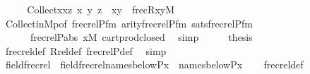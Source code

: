 \begin{isabellebody}
\isamarkupfalse%
\ {\isacharminus}{\kern0pt}\isanewline
\ \ \isamarkupfalse%
\ {\isachardoublequoteopen}Collect{\isacharparenleft}{\kern0pt}x{\isasymtimes}x{\isacharcomma}{\kern0pt}{\isasymlambda}z{\isachardot}{\kern0pt}\ {\isacharparenleft}{\kern0pt}{\isasymexists}x\ y{\isachardot}{\kern0pt}\ z\ {\isacharequal}{\kern0pt}\ {\isasymlangle}x{\isacharcomma}{\kern0pt}y{\isasymrangle}\ {\isasymand}\ frecR{\isacharparenleft}{\kern0pt}x{\isacharcomma}{\kern0pt}y{\isacharparenright}{\kern0pt}{\isacharparenright}{\kern0pt}{\isacharparenright}{\kern0pt}{\isasymin}M{\isachardoublequoteclose}\isanewline
\ \ \ \ \isamarkupfalse%
\ Collect{\isacharunderscore}{\kern0pt}in{\isacharunderscore}{\kern0pt}M{\isacharunderscore}{\kern0pt}{}p{\isacharbrackleft}{\kern0pt}of\ {\isachardoublequoteopen}frecrelP{\isacharunderscore}{\kern0pt}fm{\isacharparenleft}{\kern0pt}{}{\isacharparenright}{\kern0pt}{\isachardoublequoteclose}{\isacharbrackright}{\kern0pt}\ arity{\isacharunderscore}{\kern0pt}frecrelP{\isacharunderscore}{\kern0pt}fm\ sats{\isacharunderscore}{\kern0pt}frecrelP{\isacharunderscore}{\kern0pt}fm\isanewline
\ \ \ \ \ \ frecrelP{\isacharunderscore}{\kern0pt}abs\ {\isacartoucheopen}x{\isasymin}M{\isacartoucheclose}\ cartprod{\isacharunderscore}{\kern0pt}closed\ \isamarkupfalse%
\ simp\isanewline
\ \ \isamarkupfalse%
\ \isamarkupfalse%
\ {\isacharquery}{\kern0pt}thesis\isanewline
\ \ \ \ \isamarkupfalse%
\ frecrel{\isacharunderscore}{\kern0pt}def\ Rrel{\isacharunderscore}{\kern0pt}def\ frecrelP{\isacharunderscore}{\kern0pt}def\ \isamarkupfalse%
\ simp\isanewline
{}\isamarkupfalse%
%
\endisatagproof
{\isafoldproof}%
%
\isadelimproof
\isanewline
%
\endisadelimproof
\isanewline
{}\isamarkupfalse%
\ field{\isacharunderscore}{\kern0pt}frecrel\ {\isacharcolon}{\kern0pt}\ {\isachardoublequoteopen}field{\isacharparenleft}{\kern0pt}frecrel{\isacharparenleft}{\kern0pt}names{\isacharunderscore}{\kern0pt}below{\isacharparenleft}{\kern0pt}P{\isacharcomma}{\kern0pt}x{\isacharparenright}{\kern0pt}{\isacharparenright}{\kern0pt}{\isacharparenright}{\kern0pt}\ {\isasymsubseteq}\ names{\isacharunderscore}{\kern0pt}below{\isacharparenleft}{\kern0pt}P{\isacharcomma}{\kern0pt}x{\isacharparenright}{\kern0pt}{\isachardoublequoteclose}\isanewline
%
\isadelimproof
\ \ %
\endisadelimproof
%
\isatagproof
{}\isamarkupfalse%
\ frecrel{\isacharunderscore}{\kern0pt}def\isanewline
\ \ \isamarkupfalse%

\end{isabellebody}
